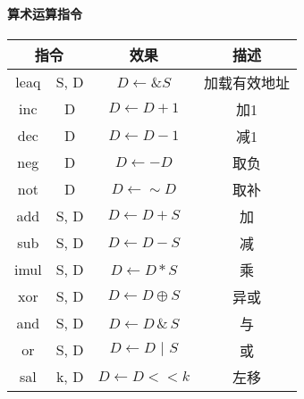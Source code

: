\paragraph{算术运算指令}
\begin{table}[H]
    \centering
    \begin{tabular}{|c c|c|c|}
        \hline
        \multicolumn{2}{|c|}{\textbf{指令}} & \textbf{效果}        & \textbf{描述}                                                           \\
        \hline
        leaq                              & S, D               & $D \leftarrow \&S$                           & 加载有效地址                 \\
        \hline
        inc                               & D                  & $D \leftarrow D + 1$                         & 加1                     \\
        dec                               & D                  & $D \leftarrow D - 1$                         & 减1                     \\
        neg                               & D                  & $D \leftarrow -D$                            & 取负                     \\
        not                               & D                  & $D \leftarrow \sim D$                        & 取补                     \\
        \hline
        add                               & S, D               & $D \leftarrow D + S$                         & 加                      \\
        sub                               & S, D               & $D \leftarrow D - S$                         & 减                      \\
        imul                              & S, D               & $D \leftarrow D * S$                         & 乘                      \\
        xor                               & S, D               & $D \leftarrow D \oplus S$                    & 异或                     \\
        and                               & S, D               & $D \leftarrow D \,\&\, S$                    & 与                      \\
        or                                & S, D               & $D \leftarrow D \,\,|\,\, S$                 & 或                      \\
        \hline
        sal                               & k, D               & $D \leftarrow D << k$                        & 左移                     \\

\end{tabular}
\end{table}
